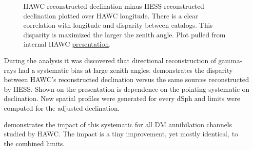 \begin{figure}
    \caption{HAWC reconstructed declination minus HESS reconstructed declination plotted over HAWC longitude. There is a clear correlation with longitude and disparity between catalogs. This disparity is maximized the larger the zenith angle. Plot pulled from internal HAWC \href{https://private.hawc-observatory.org/wiki/images/3/30/HAWCMeetingOct2020-AJS-Pointing.pdf}{presentation}.}
    \label{fig:pointing_problem}
\end{figure}

During the analysis it was discovered that directional reconstruction of gamma-rays had a systematic bias at large zenith angles.
 demonstrates the disparity between HAWC's reconstructed declination versus the same sources reconstructed by HESS.
Shown on the presentation is dependence on the pointing systematic on declination.
New spatial profiles were generated for every dSph and limits were computed for the adjusted declination.

 demonstrates the impact of this systematic for all DM annihilation channels studied by HAWC. The impact is a tiny improvement, yet mostly identical, to the combined limits.

